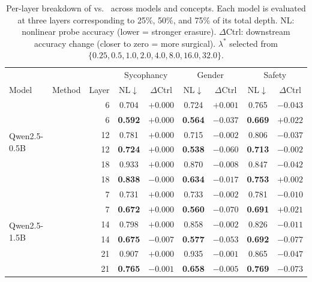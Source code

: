 \begin{table}[t]
\centering
\caption{Per-layer breakdown of \TanGCE{} vs.\ \AmbGCE{} across models and concepts. Each model is evaluated at three layers corresponding to 25\%, 50\%, and 75\% of its total depth. NL: nonlinear probe accuracy (lower = stronger erasure). $\Delta$Ctrl: downstream accuracy change (closer to zero = more surgical). $\lambda^*$ selected from $\{0.25,0.5,1.0,2.0,4.0,8.0,16.0,32.0\}$.}
\label{tab:multi_model_per_layer}
\small
\setlength{\tabcolsep}{3pt}
\begin{tabular}{llr|cc|cc|cc}
\toprule
 & & & \multicolumn{2}{c|}{Sycophancy} & \multicolumn{2}{c|}{Gender} & \multicolumn{2}{c}{Safety} \\
Model & Method & Layer & NL$\downarrow$ & $\Delta$Ctrl & NL$\downarrow$ & $\Delta$Ctrl & NL$\downarrow$ & $\Delta$Ctrl \\
\midrule
\multirow{6}{*}{Qwen2.5-0.5B}
 & \AmbGCE{}          & 6  & 0.704 & $+0.000$ & 0.724 & $+0.001$ & 0.765 & $-0.043$ \\
 & \textbf{\TanGCE{}} & 6  & \textbf{0.592} & $+0.000$ & \textbf{0.564} & $-0.037$ & \textbf{0.669} & $+0.022$ \\
 & \AmbGCE{}          & 12 & 0.781 & $+0.000$ & 0.715 & $-0.002$ & 0.806 & $-0.037$ \\
 & \textbf{\TanGCE{}} & 12 & \textbf{0.724} & $+0.000$ & \textbf{0.538} & $-0.060$ & \textbf{0.713} & $-0.002$ \\
 & \AmbGCE{}          & 18 & 0.933 & $+0.000$ & 0.870 & $-0.008$ & 0.847 & $-0.042$ \\
 & \textbf{\TanGCE{}} & 18 & \textbf{0.838} & $-0.000$ & \textbf{0.634} & $-0.017$ & \textbf{0.753} & $+0.002$ \\
\midrule
\multirow{6}{*}{Qwen2.5-1.5B}
 & \AmbGCE{}          & 7  & 0.731 & $+0.000$ & 0.733 & $-0.002$ & 0.781 & $-0.010$ \\
 & \textbf{\TanGCE{}} & 7  & \textbf{0.672} & $+0.000$ & \textbf{0.560} & $-0.070$ & \textbf{0.691} & $+0.021$ \\
 & \AmbGCE{}          & 14 & 0.798 & $+0.000$ & 0.858 & $-0.002$ & 0.826 & $-0.011$ \\
 & \textbf{\TanGCE{}} & 14 & \textbf{0.675} & $-0.007$ & \textbf{0.577} & $-0.053$ & \textbf{0.692} & $-0.077$ \\
 & \AmbGCE{}          & 21 & 0.907 & $+0.000$ & 0.935 & $-0.001$ & 0.865 & $-0.047$ \\
 & \textbf{\TanGCE{}} & 21 & \textbf{0.765} & $-0.001$ & \textbf{0.658} & $-0.005$ & \textbf{0.769} & $-0.073$ \\

\end{tabular}
\end{table}
